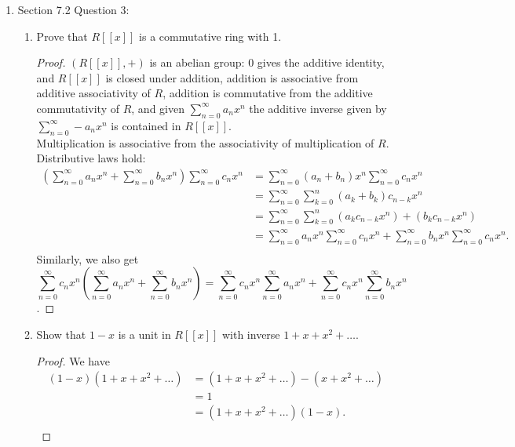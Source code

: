\documentclass{article}
\begin{document}
\begin{enumerate}[label={\bf Q\arabic*:}]
  \item Section 7.2 Question 3:
    \begin{enumerate}
      \item Prove that $R[[x]]$ is a commutative ring with 1.
        \begin{proof}
          $(R[[x]],+)$ is an abelian group: 0 gives the additive identity,
          and $R[[x]]$ is closed under addition, addition is associative
          from additive associativity of $R$, addition is commutative from
          the additive commutativity of $R$, and given
          $\sum_{n=0}^{\infty}a_nx^n$ the additive inverse given by
          $\sum_{n=0}^{\infty}-a_nx^n$ is contained in $R[[x]]$. \\

          Multiplication is associative from the associativity of
          multiplication of $R$. Distributive laws hold:
          \begin{align*}
            (\sum_{n=0}^{\infty}a_nx^n+\sum_{n=0}^{\infty}b_nx^n)
            \sum_{n=0}^{\infty}c_nx^n &=
            \sum_{n=0}^{\infty}(a_n+b_n)x^n\sum_{n=0}^{\infty}c_nx^n \\
              &= \sum_{n=0}^{\infty}\sum_{k=0}^n(a_k+b_k)c_{n-k}x^n \\
              &=
              \sum_{n=0}^{\infty}\sum_{k=0}^n(a_kc_{n-k}x^n)+(b_kc_{n-k}x^n) \\
              &= \sum_{n=0}^{\infty}a_nx^n\sum_{n=0}^{\infty}c_nx^n
              +\sum_{n=0}^{\infty}b_nx^n\sum_{n=0}^{\infty}c_nx^n. \\
          \end{align*}
          Similarly, we also get
          \[\sum_{n=0}^{\infty}c_nx^n
          (\sum_{n=0}^{\infty}a_nx^n+\sum_{n=0}^{\infty}b_nx^n)
          = \sum_{n=0}^{\infty}c_nx^n\sum_{n=0}^{\infty}a_nx^n+
          \sum_{n=0}^{\infty}c_nx^n\sum_{n=0}^{\infty}b_nx^n\].
        \end{proof}

      \item Show that $1-x$ is a unit in $R[[x]]$ with inverse
        $1+x+x^2+\ldots$.
        \begin{proof}
          We have
          \begin{align*}
            (1-x)(1+x+x^2+\ldots) &= (1+x+x^2+\ldots)-(x+x^2+\ldots) \\
                                  &= 1 \\
                                  &= (1+x+x^2+\ldots)(1-x). \\
          \end{align*}
        \end{proof}


\end{enumerate}
\end{enumerate}
\end{document}
